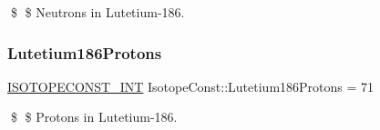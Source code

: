 \$ \$ Neutrons in Lutetium-\/186. \mbox{\label{group___isotope_const-_lutetium-_lu186_ga9a18ff45c684b7f964d20f26d949c253}} 
\subsubsection{\texorpdfstring{Lutetium186\+Protons}{Lutetium186Protons}}
{\footnotesize\ttfamily \mbox{\hyperlink{group___isotope_const-_macros_ga5f18360b3e99483a35c32d789e62621c}{I\+S\+O\+T\+O\+P\+E\+C\+O\+N\+S\+T\+\_\+\+I\+NT}} Isotope\+Const\+::\+Lutetium186\+Protons = 71}

\$ \$ Protons in Lutetium-\/186. 
